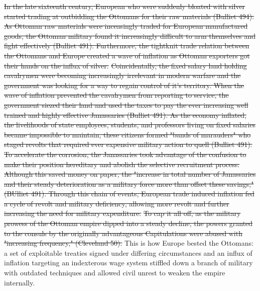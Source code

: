 \documentclass[letterpaper]{article}
\begin{document}
\sout{In the late sixteenth century, European who were suddenly bloated with silver started trading at outbidding the Ottomans for their raw materials (Bulliet 494). As Ottoman raw materials were inceasingly traded for European manufactured goods, the Ottoman military found it increasingly difficult to arm themselves and fight effectively (Bulliet 491). Furthermore, the tightknit trade relation between the Ottomans and Europe created a wave of inflation as Ottoman exporters got their hands on the influx of silver.}
\sout{Coincidentally, the fixed salary land holding cavalrymen were becoming increasingly irrelevant in modern warfare and the government was looking for a way to regain control of it's territory. When the wave of inflation prevented the cavalrymen from reporting to service, the government siezed their land and used the taxes to pay the ever increasing well trained and highly effective Janassaries (Bulliet 491). As the economy inflated, the livelihoods of state employees, students, and professors living on fixed salaries became impossible to maintain, these citizens formed "bands of marauders" who staged revolts that required ever expensive military action to quell (Bulliet 491).}
\sout{To accelerate the corrosion, the Janassaries took advantage of the confusion to make their position hereditary and abolish the selective recruitment process. Although this saved money on paper, the "increase in total number of Janassaries and their steady deterioration as a military force more than offset these savings," (BUlliet 491). Through this chain of events, European trade induced inflation fed a cycle of revolt and military deficiency, allowing more revolt and further increasing the need for military expenditure.}
\sout{To cap it all off, as the military prowess of the Ottoman empire dipped into a steady decline, the powers granted to the consuls by the originally advantageous Capitulations were abused with "increasing frequency," (Cleveland 50).}
This is how Europe bested the Ottomans: a set of exploitable treaties signed under differing circumstances and an influx of inflation targeting an indexterous wage system stiffled down a branch of military with outdated techniques and allowed civil unrest to weaken the empire internally.
\end{document}
